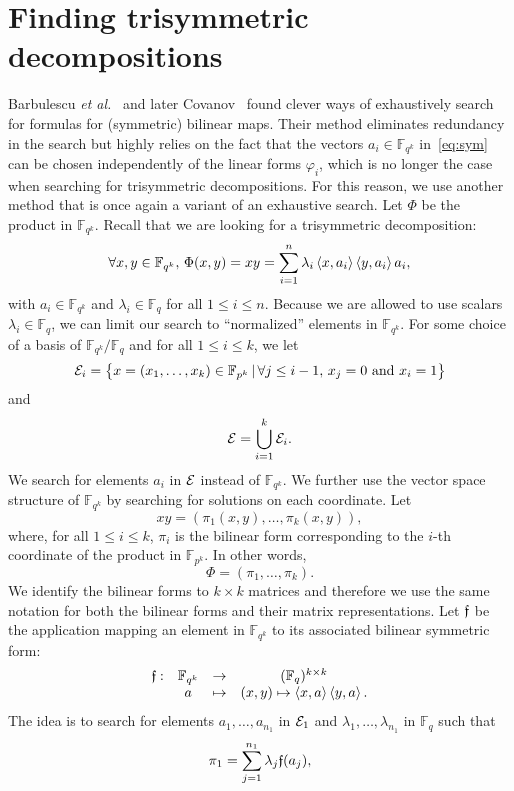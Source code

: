 \documentclass[11pt]{article}
\begin{document}
\section{Finding trisymmetric decompositions}
\label{sec:algos}
Barbulescu \emph{et al.}~\cite{BDEZ12} and later Covanov~\cite{Covanov19} found
clever ways of exhaustively search for formulas for (symmetric) bilinear maps.
Their method eliminates redundancy in the search but highly
relies on the fact that the vectors $a_i\in\mathbb{F}_{q^k}$ in~\eqref{eq:sym} can be chosen independently of
the linear forms $\varphi_i$, which is no longer
the case when searching for trisymmetric decompositions. For this reason, we
use another method that is once again a variant of an exhaustive search. Let
$\Phi$ be the product in $\mathbb{F}_{q^k}$. Recall
that we are looking for a trisymmetric decomposition:
\[
  \forall x, y\in\mathbb{F}_{q^k},\,\Phi(x, y) = xy =
  \sum_{i=1}^{n}\lambda_i\left\langle x,a_i\right\rangle\left\langle y,a_i\right\rangle a_i,
\]
with $a_i\in\mathbb{F}_{q^k}$ and $\lambda_i\in\mathbb{F}_q$ for all $1\leq i
\leq n$. Because we are allowed to use scalars $\lambda_i\in\mathbb{F}_q$, we
can limit our search to ``normalized'' elements in $\mathbb{F}_{q^k}$. For some
choice of a basis of $\mathbb{F}_{q^k}/\mathbb{F}_q$ and for all
$1\leq i\leq k$, we let
\[
  \mathcal{E}_i=\left\{ x=(x_1, \dots, x_k)\in\mathbb{F}_{p^k}
  \,|\, \forall j\leq i-1,\,x_j=0\text{ and }x_i=1 \right\}
\]
and
\[
  \mathcal{E} = \bigcup_{i=1}^k\mathcal{E}_i.
\]
We search for elements $a_i$ in $\mathcal{E}$ instead of $\mathbb{F}_{q^k}$. We further
use the vector space structure of $\mathbb{F}_{q^k}$ by searching for solutions
on each coordinate.
Let 
\[
  xy = (\pi_1(x, y), \dots, \pi_k(x, y)),
\]
where, for all $1\leq i\leq k$, $\pi_i$ is the bilinear form corresponding to
the $i$-th coordinate of the product in $\mathbb{F}_{p^k}$. In other words, 
\[
  \Phi = (\pi_1, \dots, \pi_k).
\]
We identify the
bilinear forms to $k\times k$ matrices and therefore we use the same notation for both the
bilinear forms and their matrix representations. Let $\mathfrak{f}$ be the application mapping an element in
$\mathbb{F}_{q^k}$ to its associated bilinear symmetric form:
\[
\begin{array}{cccc}
  \mathfrak{f}: & \mathbb{F}_{q^k} & \to & (\mathbb{F}_q)^{k\times k} \\
  & a & \mapsto & (x, y)\mapsto \left\langle x,a\right\rangle\left\langle y,a\right\rangle.
\end{array}
\]
The idea is to search for elements $a_1, \dots, a_{n_1}$ in $\mathcal{E}_1$ and
$\lambda_1, \dots, \lambda_{n_1}$ in $\mathbb{F}_q$ such that 
\begin{equation}
  \pi_1 = \sum_{j=1}^{n_1}\lambda_j\mathfrak{f}(a_j),
  \label{eq:pi1}
\end{equation}
\end{document}
